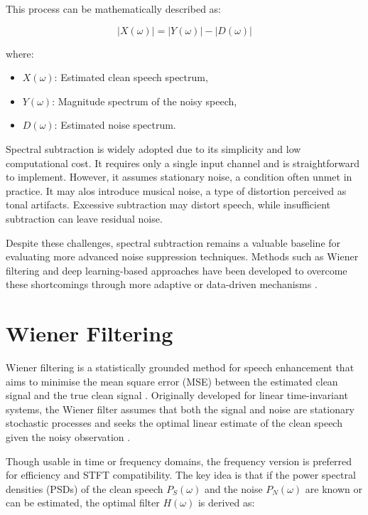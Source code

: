 This process can be mathematically described as:

\begin{equation}
    |X(\omega)| = |Y(\omega)| - |D(\omega)|
\end{equation}

where:
\begin{itemize}
    \item \( X(\omega) \): Estimated clean speech spectrum,
    \item \( Y(\omega) \): Magnitude spectrum of the noisy speech,
    \item \( D(\omega) \): Estimated noise spectrum.
\end{itemize}

Spectral subtraction is widely adopted due to its simplicity and low computational cost. It requires only a single input channel and is straightforward to implement. However, it assumes stationary noise, a condition often unmet in practice. It may alos introduce musical noise, a type of distortion perceived as tonal artifacts. Excessive subtraction may distort speech, while insufficient subtraction can leave residual noise.

Despite these challenges, spectral subtraction remains a valuable baseline for evaluating more advanced noise suppression techniques. Methods such as Wiener filtering and deep learning-based approaches have been developed to overcome these shortcomings through more adaptive or data-driven mechanisms \cite{loizou2013speech}.


\section{Wiener Filtering}
\label{sec:wiener_filtering}

Wiener filtering is a statistically grounded method for speech enhancement that aims to minimise the mean square error (MSE) between the estimated clean signal and the true clean signal \cite{loizou2013speech}. Originally developed for linear time-invariant systems, the Wiener filter assumes that both the signal and noise are stationary stochastic processes and seeks the optimal linear estimate of the clean speech given the noisy observation \cite{dubey2016evaluation}.

Though usable in time or frequency domains, the frequency version is preferred for efficiency and STFT compatibility. The key idea is that if the power spectral densities (PSDs) of the clean speech \(P_S(\omega)\) and the noise \(P_N(\omega)\) are known or can be estimated, the optimal filter \(H(\omega)\) is derived as:

